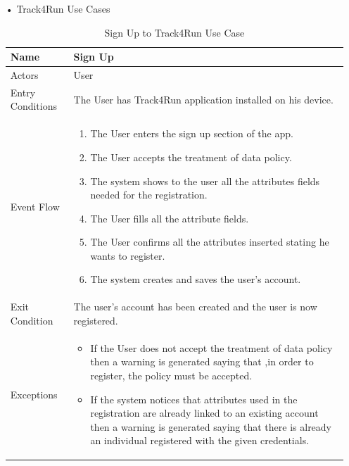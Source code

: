 \begin{enumerate}
\FloatBarrier
\item[•]{\Large Track4Run Use Cases}
\begin{table}[h]
\begin{tabular}{|p{3.4cm}|p{}|}
\hline
Name             & Sign Up \\ \hline
Actors           & User  \\ \hline
Entry Conditions & The User has Track4Run application installed on his device.    \\ \hline
Event Flow       & \begin{enumerate}
			\item The User enters the sign up section of the app.
            \item The User accepts the treatment of data policy.
            \item The system shows to the user all the attributes fields needed for the registration.
            \item The User fills all the attribute fields.
            \item The User confirms all the attributes inserted stating he wants to register.
            \item The system creates and saves the user's account.
        \end{enumerate}\\ \hline
Exit Condition   & The user's account has been created and the user is now registered.\\ \hline
Exceptions       & \begin{itemize}
\item If the User does not accept the treatment of data policy then a warning is generated saying that ,in order to register, the policy must be accepted.
\item If the system notices that attributes used in the registration are already linked to an existing account then a warning is generated saying that there is already an individual registered with the given credentials.
\end{itemize}\\ \hline
\end{tabular}
\caption{Sign Up to Track4Run Use Case}
\end{table}
\FloatBarrier


\end{enumerate}
